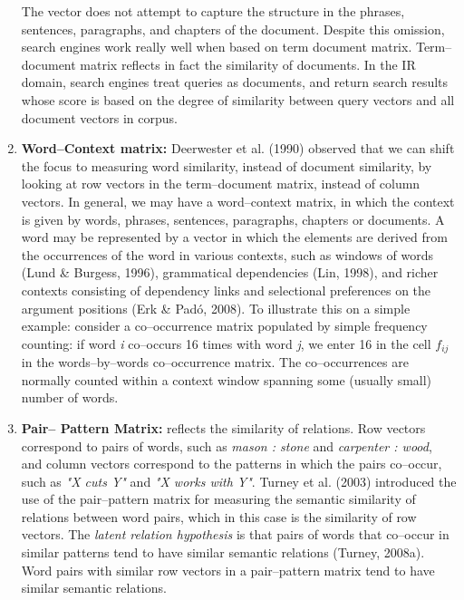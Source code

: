 \begin{enumerate}
The vector does not attempt to capture the structure in the phrases, sentences, paragraphs, and 
chapters of the document. Despite this omission, search engines work really well when based on term 
document matrix. Term--document matrix reflects in fact the similarity of documents. In the IR domain, 
search engines treat queries as documents, and return search results whose score is based on the degree of similarity 
between query vectors and all document vectors in corpus.
\item \textbf{Word--Context matrix:} Deerwester et al. (1990) observed 
that we can shift the focus to measuring word similarity, instead of document similarity, by looking at 
row vectors in the term--document matrix, instead of column vectors. In general, we may have a 
word--context matrix, in which the context is given by words, phrases, sentences, paragraphs, chapters 
or documents. A word may be represented by a vector in which the elements are derived from the 
occurrences of the word in various contexts, such as windows of words (Lund \& Burgess, 1996), 
grammatical dependencies (Lin, 1998), and richer contexts consisting of dependency links 
and selectional preferences on the argument positions (Erk \& Pad\'o, 2008). To 
illustrate this on a simple example: consider a co--occurrence matrix populated by simple frequency 
counting: if word \textit{i} co--occurs 16 times with word \textit{j}, we enter 16 in the cell $f_{ij}$ in 
the words--by--words co--occurrence matrix. The co--occurrences are normally counted within a 
context window spanning some (usually small) number of words.

\item \textbf{Pair-- Pattern Matrix:} reflects the similarity of relations. Row vectors correspond to pairs of words, such as \textit{mason : stone} and \textit{carpenter : wood}, and column vectors correspond to the patterns in which the pairs co--occur, such as \textit{"X cuts Y"} and \textit{"X works with Y"}. Turney et al. (2003) introduced the use of the pair--pattern matrix for measuring the semantic similarity of relations between word pairs, which in this case is the similarity of row vectors. The \textit{latent relation hypothesis} is that pairs of words that co--occur in similar patterns tend to have similar semantic relations (Turney, 2008a). Word pairs with similar row vectors in a pair--pattern matrix tend to have similar semantic relations.
\end{enumerate}

